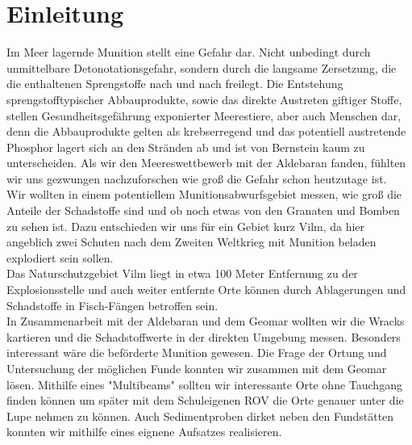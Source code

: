  

\chapter[Einleitung]{Einleitung}

Im Meer lagernde Munition stellt eine Gefahr dar. Nicht unbedingt durch unmittelbare Detonotationsgefahr, 
sondern durch die langsame Zersetzung, die die enthaltenen Sprengstoffe nach und nach 
freilegt\cite{zeitbomben}. Die Entstehung sprengstofftypischer Abbauprodukte, sowie das direkte Austreten 
giftiger Stoffe, stellen Gesundheitsgefährung exponierter Meerestiere, aber auch Menschen dar\cite{spread}, denn die
Abbauprodukte gelten als krebserregend und das potentiell austretende Phosphor lagert sich an den Stränden 
ab und ist von Bernstein kaum zu unterscheiden. Als wir den Meereswettbewerb mit der Aldebaran fanden, 
fühlten wir uns gezwungen nachzuforschen wie groß die Gefahr schon heutzutage ist.\\

Wir wollten in einem potentiellem Munitionsabwurfsgebiet messen, wie groß die Anteile der Schadstoffe sind und 
ob noch etwas von den Granaten und Bomben zu sehen ist. Dazu entschieden wir uns für ein Gebiet kurz Vilm,
da hier angeblich zwei Schuten nach dem Zweiten Weltkrieg mit Munition beladen explodiert sein sollen.\\

Das Naturschutzgebiet Vilm liegt in etwa 100 Meter Entfernung zu der Explosionsstelle und auch weiter 
entfernte Orte können durch Ablagerungen und Schadstoffe in Fisch-Fängen betroffen sein.\\

In Zusammenarbeit mit der Aldebaran und dem Geomar wollten wir die Wracks kartieren und die Schadstoffwerte in
der direkten Umgebung messen. Besonders interessant wäre die beförderte Munition gewesen. Die Frage der
Ortung und Untersuchung der möglichen Funde konnten wir zusammen mit dem Geomar lösen. Mithilfe eines 
"Multibeams" sollten wir interessante Orte ohne Tauchgang finden können um später mit dem Schuleigenen 
ROV die Orte genauer unter die Lupe nehmen zu können. Auch Sedimentproben dirket neben den Fundstätten 
konnten wir mithilfe eines eignene Aufsatzes realisieren.\\


